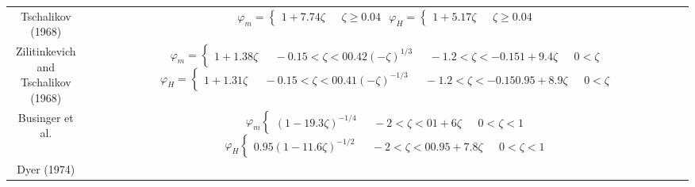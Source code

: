 {\begin{table}[p]
\begin{tabular}{| c | c |}
        Tschalikov (1968) \cite{foken:2008}  & \shortstack{$\varphi_{m} = \begin{cases} 1 + 7.74\zeta & \text{    } \zeta \geq 0.04 \\ \end{cases}$\\$\varphi_{H} = \begin{cases} 1 + 5.17\zeta & \text{    } \zeta \geq 0.04 \\ \end{cases}$ } \\ 
        \shortstack{Zilitinkevich and \\ Tschalikov (1968) \cite{zilitinkevich:1968}}  & \shortstack{$\varphi_{m} = \begin{cases} 1 + 1.38 \zeta & \text{    } -0.15 < \zeta < 0 \\ 0.42(-\zeta)^{1/3} & \text{    } -1.2 < \zeta < -0.15 \\ 1 + 9.4 \zeta & \text{    } 0 < \zeta \\ \end{cases}$\\$\varphi_{H} = \begin{cases} 1 + 1.31 \zeta & \text{    } -0.15 < \zeta < 0 \\ 0.41(-\zeta)^{-1/3} & \text{    } -1.2 < \zeta < -0.15 \\ 0.95 + 8.9 \zeta & \text{    } 0 < \zeta \\ \end{cases}$ } \\ 
        Businger et al. \cite{businger:1971}  & \shortstack{$\varphi_{m} \begin{cases} (1 - 19.3 \zeta)^{-1/4} & \text{    } -2 < \zeta < 0 \\ 1 + 6\zeta & \text{    } 0 < \zeta < 1 \\ \end{cases}$\\$\varphi_{H} \begin{cases} 0.95(1 - 11.6 \zeta)^{-1/2} & \text{    } -2 < \zeta < 0 \\ 0.95 + 7.8\zeta & \text{    } 0 < \zeta < 1 \\ \end{cases}$ } \\ 
        Dyer (1974) \cite{dyer:1974} & \shortstack{$\varphi_{m} \begin{cases} (1 - 15.2 \zeta)^{-1/2} & \text{    } -1 < \zeta < 0 \\ 1 + 4.8\zeta & \text{    } 0 < \zeta \\  \end{cases}$ } \\ 

\end{tabular}
\end{table}}
